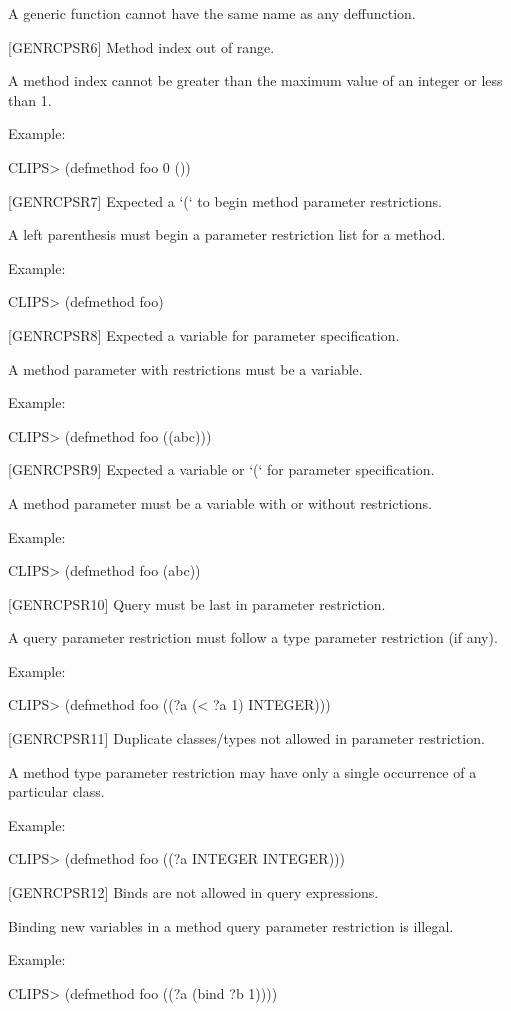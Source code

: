 \documentclass[letterpaper,10pt,english]{sphinxmanual}
\begin{document}
A generic function cannot have the same name as any deffunction.

{[}GENRCPSR6{]} Method index out of range.

A method index cannot be greater than the maximum value of an integer or
less than 1.

Example:

CLIPS\textgreater{} (defmethod foo 0 ())

{[}GENRCPSR7{]} Expected a ‘(‘ to begin method parameter restrictions.

A left parenthesis must begin a parameter restriction list for a method.

Example:

CLIPS\textgreater{} (defmethod foo)

{[}GENRCPSR8{]} Expected a variable for parameter specification.

A method parameter with restrictions must be a variable.

Example:

CLIPS\textgreater{} (defmethod foo ((abc)))

{[}GENRCPSR9{]} Expected a variable or ‘(‘ for parameter specification.

A method parameter must be a variable with or without restrictions.

Example:

CLIPS\textgreater{} (defmethod foo (abc))

{[}GENRCPSR10{]} Query must be last in parameter restriction.

A query parameter restriction must follow a type parameter restriction
(if any).

Example:

CLIPS\textgreater{} (defmethod foo ((?a (\textless{} ?a 1) INTEGER)))

{[}GENRCPSR11{]} Duplicate classes/types not allowed in parameter
restriction.

A method type parameter restriction may have only a single occurrence of
a particular class.

Example:

CLIPS\textgreater{} (defmethod foo ((?a INTEGER INTEGER)))

{[}GENRCPSR12{]} Binds are not allowed in query expressions.

Binding new variables in a method query parameter restriction is
illegal.

Example:

CLIPS\textgreater{} (defmethod foo ((?a (bind ?b 1))))
\end{document}
